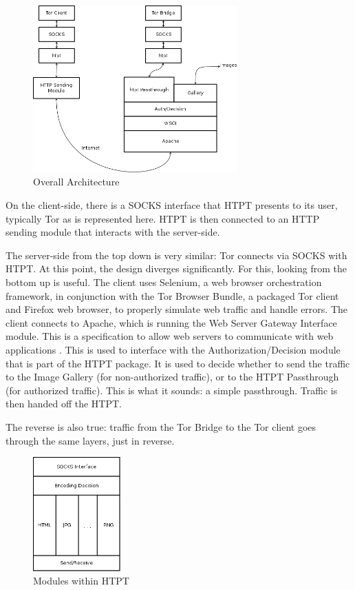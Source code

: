 \begin{figure}[t]
\centering
\includegraphics[width=0.7\textwidth]{Overall_architecture}
\caption{Overall Architecture}
\label{fig:overall_arch}
\end{figure}

On the client-side, there is a SOCKS interface that HTPT presents to its user, typically Tor as is represented here. HTPT is then connected to an HTTP sending module that interacts with the server-side.

The server-side from the top down is very similar: Tor connects via SOCKS with HTPT. At this point, the design diverges significantly. For this, looking from the bottom up is useful. 
The client uses Selenium, a web browser orchestration framework, in conjunction with the Tor Browser Bundle, a packaged Tor client and Firefox web browser, to properly simulate web traffic and handle errors. 
The client connects to Apache, which is running the Web Server Gateway Interface module. This is a specification to allow web servers to communicate with web applications \cite{Ref16}. This is used to interface with the Authorization/Decision module that is part of the HTPT package. It is used to decide whether to send the traffic to the Image Gallery (for non-authorized traffic), or to the HTPT Passthrough (for authorized traffic). This is what it sounds: a simple passthrough. Traffic is then handed off the HTPT. 

The reverse is also true: traffic from the Tor Bridge to the Tor client goes through the same layers, just in reverse. 

\begin{figure}[b]
\centering
\includegraphics[width=0.3\textwidth]{htpt_architecture}
\caption{Modules within HTPT}
\label{fig:htpt_modules}
\end{figure}

